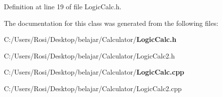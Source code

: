 Definition at line 19 of file Logic\-Calc.h.

The documentation for this class was generated from the following files:\begin{CompactItemize}
\item 
C:/Users/Rosi/Desktop/belajar/Calculator/{\bf Logic\-Calc.h}\item 
C:/Users/Rosi/Desktop/belajar/Calculator/Logic\-Calc2.h\item 
C:/Users/Rosi/Desktop/belajar/Calculator/{\bf Logic\-Calc.cpp}\item 
C:/Users/Rosi/Desktop/belajar/Calculator/Logic\-Calc2.cpp\end{CompactItemize}
